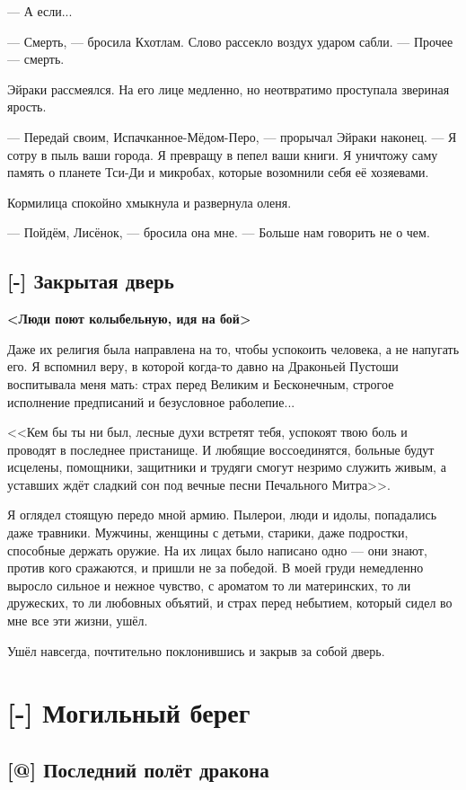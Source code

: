 --- А если...

--- Смерть, --- бросила Кхотлам.
Слово рассекло воздух ударом сабли.
--- Прочее --- смерть.

Эйраки рассмеялся.
На его лице медленно, но неотвратимо проступала звериная ярость.

--- Передай своим, Испачканное-Мёдом-Перо, --- прорычал Эйраки наконец.
--- Я сотру в пыль ваши города.
Я превращу в пепел ваши книги.
Я уничтожу саму память о планете Тси-Ди и микробах, которые возомнили себя её хозяевами.

Кормилица спокойно хмыкнула и развернула оленя.

--- Пойдём, Лисёнок, --- бросила она мне.
--- Больше нам говорить не о чем.

\section{[-] Закрытая дверь}

\textbf{<Люди поют колыбельную, идя на бой>}

Даже их религия была направлена на то, чтобы успокоить человека, а не напугать его.
Я вспомнил веру, в которой когда-то давно на Драконьей Пустоши воспитывала меня мать: страх перед Великим и Бесконечным, строгое исполнение предписаний и безусловное раболепие...

<<Кем бы ты ни был, лесные духи встретят тебя, успокоят твою боль и проводят в последнее пристанище.
И любящие воссоединятся, больные будут исцелены, помощники, защитники и трудяги смогут незримо служить живым, а уставших ждёт сладкий сон под вечные песни Печального Митра>>.

Я оглядел стоящую передо мной армию.
Пылерои, люди и идолы, попадались даже травники.
Мужчины, женщины с детьми, старики, даже подростки, способные держать оружие.
На их лицах было написано одно --- они знают, против кого сражаются, и пришли не за победой.
В моей груди немедленно выросло сильное и нежное чувство, с ароматом то ли материнских, то ли дружеских, то ли любовных объятий, и страх перед небытием, который сидел во мне все эти жизни, ушёл.

Ушёл навсегда, почтительно поклонившись и закрыв за собой дверь.

\chapter{[-] Могильный берег}

\section{[@] Последний полёт дракона}

